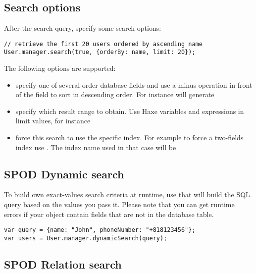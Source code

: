 \subsection{Search options}
\label{std-spod-search-options}

After the search query, specify some search options:

\begin{lstlisting} 
// retrieve the first 20 users ordered by ascending name
User.manager.search(true, {orderBy: name, limit: 20});
\end{lstlisting} 

The following options are supported:

\begin{itemize} 
	\item[\expr{orderBy}] specify one of several order database fields and use a minus operation in front of the field to sort in descending order. For instance  will generate 
	\item[\expr{limit}] specify which result range to obtain. Use Haxe variables and expressions in limit values, for instance 
	\item[\expr{forceIndex}] force this search to use the specific index. For example to force a two-fields index use . The index name used in that case will be 
\end{itemize} 

\subsection{SPOD Dynamic search}
\label{std-spod-dynamic-search}

To build own exact-values search criteria at runtime, use  that will build the SQL query based on the values you pass it. Please note that you can get runtime errors if your object contain fields that are not in the database table.

\begin{lstlisting} 
var query = {name: "John", phoneNumber: "+818123456"};
var users = User.manager.dynamicSearch(query);
\end{lstlisting} 

\subsection{SPOD Relation search}
\label{std-spod-relation-search}

